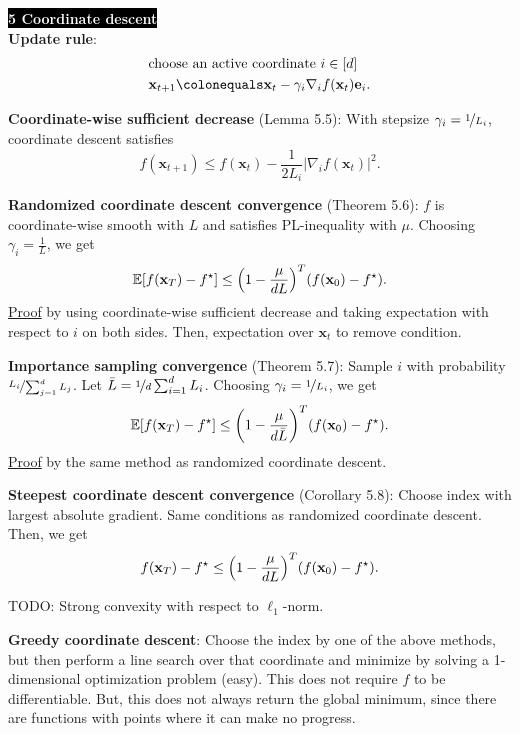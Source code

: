 \documentclass{article}
\newcommand{\lft}{\mathopen{}\mathclose\bgroup\left}
\newcommand{\rgt}{\aftergroup\egroup\right}
\newcommand{\E}{\mathbb{E}}
\renewcommand{\vec}[1]{\mathbf{#1}}
\newenvironment{topic}[1]
{\textbf{\sffamily \colorbox{black}{\textcolor{white}{#1}}} \\ \vspace{0.2cm}}
{}
\begin{document}
\begin{multicols*}{3}
\begin{topic}{5 Coordinate descent}
        \textbf{Update rule}:
        \begin{align*}
             & \text{choose an active coordinate $i \in [d]$}                                   \\
             & \vec{x}_{t+1} \colonequals \vec{x}_t - \gamma_i \nabla_i f(\vec{x}_t) \vec{e}_i.
        \end{align*}

        \textbf{Coordinate-wise sufficient decrease} (Lemma 5.5): With stepsize $\gamma_i = \nicefrac{1}{L_i}$, coordinate descent satisfies \[
            f(\vec{x}_{t+1}) \leq f(\vec{x}_t) - \frac{1}{2L_i} | \nabla_i f(\vec{x}_t) |^2.
        \]

        \textbf{Randomized coordinate descent convergence} (Theorem 5.6): $f$ is coordinate-wise
        smooth with $L$ and satisfies PL-inequality with $\mu$. Choosing $\gamma_i = \frac{1}{L}$, we
        get \[
            \E[f(\vec{x}_T) - f^\star] \leq \lft( 1 - \frac{\mu}{dL} \rgt)^T (f(\vec{x}_0) - f^\star).
        \]
        \underline{Proof} by using coordinate-wise sufficient decrease and taking expectation with
        respect to $i$ on both sides. Then, expectation over $\vec{x}_t$ to remove condition.

        \textbf{Importance sampling convergence} (Theorem 5.7): Sample $i$ with probability $\nicefrac{L_i}{\sum_{j=1}^{d} L_j}$. Let $\bar{L} = \nicefrac{1}{d} \sum_{i=1}^{d} L_i$. Choosing $\gamma_i = \nicefrac{1}{L_i}$, we get \[
            \E[f(\vec{x}_T) - f^\star] \leq \lft( 1 - \frac{\mu}{d \bar{L}} \rgt)^T (f(\vec{x}_0) - f^\star).
        \]
        \underline{Proof} by the same method as randomized coordinate descent.

        \textbf{Steepest coordinate descent convergence} (Corollary 5.8): Choose index with largest
        absolute gradient. Same conditions as randomized coordinate descent. Then, we get \[
            f(\vec{x}_T) - f^\star \leq \lft( 1 - \frac{\mu}{dL} \rgt)^T (f(\vec{x}_0) - f^\star).
        \]

        TODO: Strong convexity with respect to $\ell_1$-norm.

        \textbf{Greedy coordinate descent}: Choose the index by one of the above methods, but then
        perform a line search over that coordinate and minimize by solving a 1-dimensional
        optimization problem (easy). This does not require $f$ to be differentiable. But, this does
        not always return the global minimum, since there are functions with points where it can make
        no progress.


\end{topic}
\end{multicols*}
\end{document}
